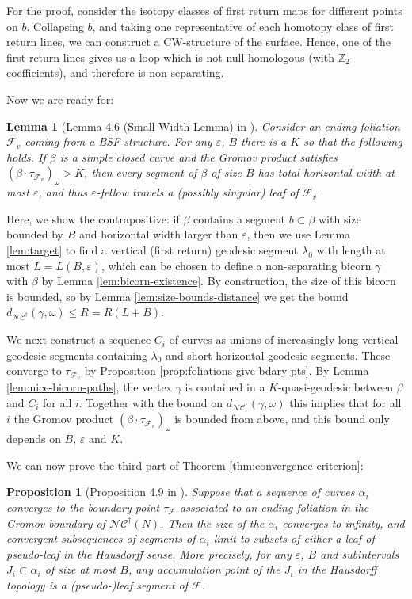 \documentclass[10pt,a4paper]{amsart}
\let\epsilon\varepsilon
\newtheorem{lemma}[theorem]{Lemma}
\newtheorem{proposition}[theorem]{Proposition}
\newcommand{\ZZ}{\mathbb{Z}}
\newcommand{\fncg}{\mathcal{NC}^\dagger}
\begin{document}
For the proof, consider the isotopy classes of first return maps for different points on $b$.
Collapsing $b$, and taking one representative of each homotopy class of first return lines, we can construct a CW-structure of the surface.
Hence, one of the first return lines gives us a loop which is not null-homologous (with $\ZZ_2$-coefficients), and therefore is non-separating.

Now we are ready for:

\begin{lemma}[Lemma 4.6 (Small Width Lemma) in \cite{BHW2}]\label{lem:small-width}
Consider an ending foliation $\mathcal{F}_v$ coming from a BSF structure.
For any $\epsilon$, $B$ there is a $K$ so that the following holds.
If $\beta$ is a simple closed curve and the Gromov product satisfies $(\beta\cdot \tau_{\mathcal{F}_v})_{\omega}>K$, then every segment of $\beta$ of size $B$ has total horizontal width at most $\epsilon$, and thus $\epsilon$-fellow travels a (possibly singular) leaf of $\mathcal{F}_v$.
\end{lemma}

Here, we show the contrapositive:
if $\beta$ contains a segment $b\subset \beta$ with size bounded by $B$ and horizontal width larger than $\epsilon$, then we use Lemma \ref{lem:target} to find a vertical (first return) geodesic segment $\lambda_0$ with length at most $L=L(B,\epsilon)$, which can be chosen to define a non-separating bicorn $\gamma$ with $\beta$ by Lemma \ref{lem:bicorn-existence}. 
By construction, the size of this bicorn is bounded, so by Lemma \ref{lem:size-bounds-distance} we get the bound $d_{\fncg}(\gamma, \omega) \leq R = R(L+B)$.

We next construct a sequence $C_i$ of curves as unions of increasingly long vertical geodesic segments containing $\lambda_0$ and short horizontal geodesic segments.
These converge to $\tau_{\mathcal{F}_v}$ by Proposition \ref{prop:foliations-give-bdary-pts}.
By Lemma \ref{lem:nice-bicorn-paths}, the vertex $\gamma$ is contained in a $K$-quasi-geodesic between $\beta$ and $C_i$ for all $i$.
Together with the bound on $d_{\fncg}(\gamma, \omega)$ this implies that for all $i$ the Gromov product $(\beta\cdot \tau_{\mathcal{F}_v})_\omega$ is bounded from above, and this bound only depends on $B$, $\epsilon$ and $K$.

We can now prove the third part of Theorem \ref{thm:convergence-criterion}:
\begin{proposition}[Proposition 4.9 in \cite{BHW2}]
Suppose that a sequence of curves $\alpha_i$ converges to the boundary point $\tau_\mathcal{F}$ associated to an ending foliation in the Gromov boundary of $\fncg(N)$.
Then the size of the $\alpha_i$ converges to infinity, and convergent subsequences of segments of $\alpha_i$ limit to subsets of either a leaf of pseudo-leaf in the Hausdorff sense.
More precisely, for any $\epsilon$, $B$ and subintervals $J_i\subset \alpha_i$ of size at most $B$, any accumulation point of the $J_i$ in the Hausdorff topology is a (pseudo-)leaf segment of $\mathcal{F}$.
\end{proposition}
\end{document}
